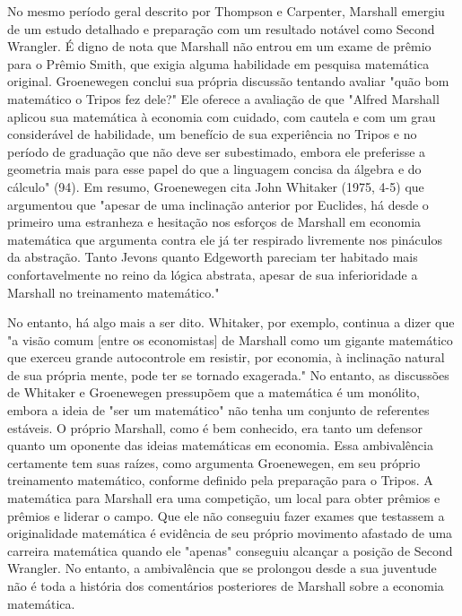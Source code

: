 \documentclass[12pt]{article}
\begin{document}
No mesmo período geral descrito por Thompson e Carpenter, Marshall emergiu de um estudo detalhado e preparação com um resultado notável como Second Wrangler. É digno de nota que Marshall não entrou em um exame de prêmio para o Prêmio Smith, que exigia alguma habilidade em pesquisa matemática original. Groenewegen conclui sua própria discussão tentando avaliar "quão bom matemático o Tripos fez dele?" Ele oferece a avaliação de que "Alfred Marshall aplicou sua matemática à economia com cuidado, com cautela e com um grau considerável de habilidade, um benefício de sua experiência no Tripos e no período de graduação que não deve ser subestimado, embora ele preferisse a geometria mais para esse papel do que a linguagem concisa da álgebra e do cálculo" (94). Em resumo, Groenewegen cita John Whitaker (1975, 4-5) que argumentou que "apesar de uma inclinação anterior por Euclides, há desde o primeiro uma estranheza e hesitação nos esforços de Marshall em economia matemática que argumenta contra ele já ter respirado livremente nos pináculos da abstração. Tanto Jevons quanto Edgeworth pareciam ter habitado mais confortavelmente no reino da lógica abstrata, apesar de sua inferioridade a Marshall no treinamento matemático."

No entanto, há algo mais a ser dito. Whitaker, por exemplo, continua a dizer que "a visão comum [entre os economistas] de Marshall como um gigante matemático que exerceu grande autocontrole em resistir, por economia, à inclinação natural de sua própria mente, pode ter se tornado exagerada." No entanto, as discussões de Whitaker e Groenewegen pressupõem que a matemática é um monólito, embora a ideia de "ser um matemático" não tenha um conjunto de referentes estáveis. O próprio Marshall, como é bem conhecido, era tanto um defensor quanto um oponente das ideias matemáticas em economia. Essa ambivalência certamente tem suas raízes, como argumenta Groenewegen, em seu próprio treinamento matemático, conforme definido pela preparação para o Tripos. A matemática para Marshall era uma competição, um local para obter prêmios e prêmios e liderar o campo. Que ele não conseguiu fazer exames que testassem a originalidade matemática é evidência de seu próprio movimento afastado de uma carreira matemática quando ele "apenas" conseguiu alcançar a posição de Second Wrangler. No entanto, a ambivalência que se prolongou desde a sua juventude não é toda a história dos comentários posteriores de Marshall sobre a economia matemática.
\end{document}
